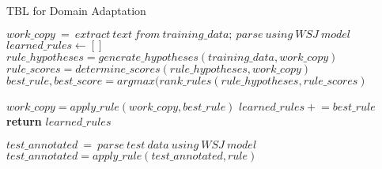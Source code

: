 \begin{algorithm}[!t]
 \caption{TBL for Domain Adaptation}\label{alg:tbl}
\begin{algorithmic}[1]
\State $work\_copy\ =\ extract\ text\ from\ training\_data;\ parse\ using\ WSJ\ model$
\State $learned\_rules \gets []$
\Repeat
{}
\State $rule\_hypotheses = generate\_hypotheses(training\_data,work\_copy)$ 
\State $rule\_scores = determine\_scores(rule\_hypotheses, work\_copy)$ 
\State $best\_rule, best\_score = argmax(rank\_rules(rule\_hypotheses, rule\_scores)$

\State $work\_copy = apply\_rule(work\_copy, best\_rule)$
\State $learned\_rules \mathrel{+}= best\_rule$
\EndIf
\vspace{-1em}
\State {}
\State \textbf{return} $learned\_rules$
\EndProcedure
\vspace{1em}

\State $test\_annotated\ =\  parse\ test\ data\ using\ WSJ\ model$
\State $test\_annotated = apply\_rule(test\_annotated, rule)$

\EndFor
\EndProcedure


\end{algorithmic}

\end{algorithm}


